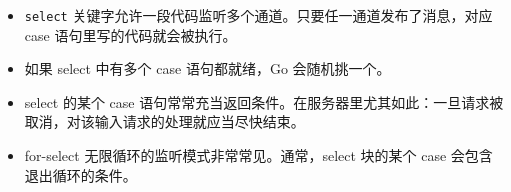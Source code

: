 \begin{itemize}
\begin{itemize}
  \item 用一个把循环变量作为参数的匿名函数来启动 goroutine。
  \end{itemize}
\item \texttt{select} 关键字允许一段代码监听多个通道。只要任一通道发布了消息，对应 case 语句里写的代码就会被执行。
\item 如果 select 中有多个 case 语句都就绪，Go 会随机挑一个。
\item select 的某个 case 语句常常充当返回条件。在服务器里尤其如此：一旦请求被取消，对该输入请求的处理就应当尽快结束。
\item for-select 无限循环的监听模式非常常见。通常，select 块的某个 case 会包含退出循环的条件。
\end{itemize}
